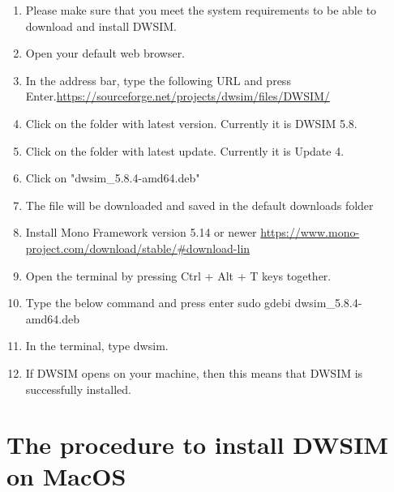 \documentclass[12pt,a4paper]{article}
\begin{document}
\begin{enumerate}
\item Please make sure that you meet the system requirements to be able to download and install DWSIM.
\item Open your default web browser.
\item In the address bar, type the following URL and press Enter.\newline \url{https://sourceforge.net/projects/dwsim/files/DWSIM/}

\item Click on the folder with latest version. Currently it is DWSIM 5.8.

\item Click on the folder with latest update. Currently it is Update 4.
\item Click on "dwsim\_5.8.4-amd64.deb"
\item The file will be downloaded and saved in the default downloads folder
\item Install Mono Framework version 5.14 or newer
\newline \url{https://www.mono-project.com/download/stable/#download-lin}

\item Open the terminal by pressing Ctrl + Alt + T keys together.

\item Type the below command and press enter
\newline sudo gdebi dwsim\_5.8.4-amd64.deb

\item In the terminal, type dwsim.
\item If DWSIM opens on your machine, then this means that DWSIM is successfully installed.

\end{enumerate}

\section{The procedure to install DWSIM on MacOS}
\end{document}
